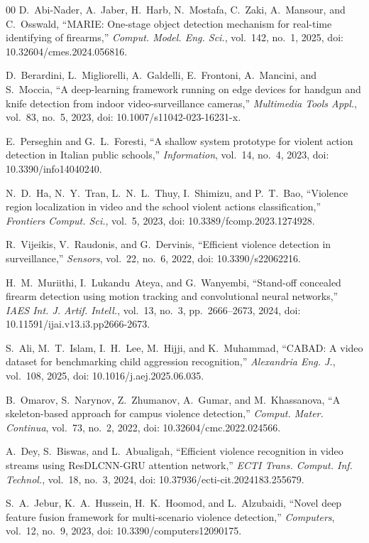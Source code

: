 \documentclass[conference]{IEEEtran}
\begin{document}
\begin{thebibliography}{00}
 D.~Abi-Nader, A.~Jaber, H.~Harb, N.~Mostafa, C.~Zaki, A.~Mansour, and C.~Osswald, ``MARIE: One-stage object detection mechanism for real-time identifying of firearms,'' \textit{Comput. Model. Eng. Sci.}, vol.~142, no.~1, 2025, doi: 10.32604/cmes.2024.056816.

 D.~Berardini, L.~Migliorelli, A.~Galdelli, E.~Frontoni, A.~Mancini, and S.~Moccia, ``A deep-learning framework running on edge devices for handgun and knife detection from indoor video-surveillance cameras,'' \textit{Multimedia Tools Appl.}, vol.~83, no.~5, 2023, doi: 10.1007/s11042-023-16231-x.

 E.~Perseghin and G.~L.~Foresti, ``A shallow system prototype for violent action detection in Italian public schools,'' \textit{Information}, vol.~14, no.~4, 2023, doi: 10.3390/info14040240.

 N.~D.~Ha, N.~Y.~Tran, L.~N.~L.~Thuy, I.~Shimizu, and P.~T.~Bao, ``Violence region localization in video and the school violent actions classification,'' \textit{Frontiers Comput. Sci.}, vol.~5, 2023, doi: 10.3389/fcomp.2023.1274928.

 R.~Vijeikis, V.~Raudonis, and G.~Dervinis, ``Efficient violence detection in surveillance,'' \textit{Sensors}, vol.~22, no.~6, 2022, doi: 10.3390/s22062216.

 H.~M.~Muriithi, I.~Lukandu~Ateya, and G.~Wanyembi, ``Stand-off concealed firearm detection using motion tracking and convolutional neural networks,'' \textit{IAES Int. J. Artif. Intell.}, vol.~13, no.~3, pp.~2666--2673, 2024, doi: 10.11591/ijai.v13.i3.pp2666-2673.

 S.~Ali, M.~T.~Islam, I.~H.~Lee, M.~Hijji, and K.~Muhammad, ``CABAD: A video dataset for benchmarking child aggression recognition,'' \textit{Alexandria Eng. J.}, vol.~108, 2025, doi: 10.1016/j.aej.2025.06.035.

 B.~Omarov, S.~Narynov, Z.~Zhumanov, A.~Gumar, and M.~Khassanova, ``A skeleton-based approach for campus violence detection,'' \textit{Comput. Mater. Continua}, vol.~73, no.~2, 2022, doi: 10.32604/cmc.2022.024566.

 A.~Dey, S.~Biswas, and L.~Abualigah, ``Efficient violence recognition in video streams using ResDLCNN-GRU attention network,'' \textit{ECTI Trans. Comput. Inf. Technol.}, vol.~18, no.~3, 2024, doi: 10.37936/ecti-cit.2024183.255679.

 S.~A.~Jebur, K.~A.~Hussein, H.~K.~Hoomod, and L.~Alzubaidi, ``Novel deep feature fusion framework for multi-scenario violence detection,'' \textit{Computers}, vol.~12, no.~9, 2023, doi: 10.3390/computers12090175.


\end{thebibliography}
\end{document}
